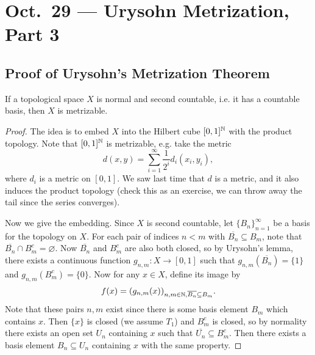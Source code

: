 \chapter{Oct.~29 --- Urysohn Metrization, Part 3}

\section{Proof of Urysohn's Metrization Theorem}

\begin{theorem}
  If a topological space $X$ is normal and second countable, i.e. it
  has a countable basis, then
  $X$ is metrizable.
\end{theorem}

\begin{proof}
  The idea is to embed $X$ into the Hilbert cube
  $[0, 1]^{\mathbb{N}}$ with the product topology. Note that
  $[0, 1]^{\mathbb{N}}$ is metrizable, e.g. take the metric
  \[
    d(x, y) = \sum_{i = 1}^\infty \frac{1}{2^i} 
    d_i(x_i, y_i),
  \]
  where $d_i$ is a metric on $[0, 1]$. We saw last
  time that $d$ is a metric, and it also induces
  the product topology (check this as an exercise,
  we can throw away the tail since the series
  converges).

  Now we give the embedding. Since $X$ is second
  countable, let $\{B_n\}_{n = 1}^\infty$ be a
  basis for the topology on $X$. For each pair of
  indices $n < m$ with $\overline{B_n} \subseteq B_m$,
  note that $\overline{B_n} \cap B_m^c = \varnothing$.
  Now $\overline{B_n}$ and $B_m^c$ are also both
  closed, so by Urysohn's lemma, there exists a
  continuous
  function $g_{n, m} : X \to [0, 1]$ such that
  $g_{n, m}(\overline{B_n}) = \{1\}$ and
  $g_{n, m}(B_m^c) = \{0\}$. Now for any
  $x \in X$, define its image by
  \[
    f(x) = (g_{n, m}(x))_{n, m \in \mathbb{N}, \overline{B_n} \subseteq B_m}.
  \]
  Note that these pairs $n, m$ exist since
  there is some basis element $B_m$ which contains
  $x$. Then $\{x\}$ is closed (we
  assume $T_1$) and $B_m^c$ is closed, so by
  normality there exists an open set $U_n$ containing
  $x$ such that $\overline{U_n} \subseteq B_m^c$.
  Then there exists a basis element $B_n \subseteq U_n$
  containing $x$ with the same property.


\end{proof}
